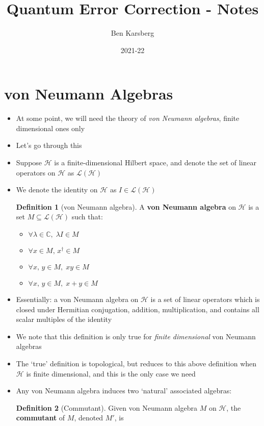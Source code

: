 \documentclass[12pt,a4paper]{article}
\title{Quantum Error Correction - Notes}
\author{Ben Karsberg}
\date{2021-22}
\numberwithin{equation}{section}
\theoremstyle{definition}
\newtheorem{definition}{Definition}[section]
\theoremstyle{theorem}
\begin{document}
	\maketitle
	\section{von Neumann Algebras}
	\newcommand{\lops}{\mathcal{L}(\mathcal{H})}
	\begin{itemize}
		\item At some point, we will need the theory of \textit{von Neumann algebras}, finite dimensional ones only
		\item Let's go through this
		\item Suppose $\mathcal{H}$ is a finite-dimensional Hilbert space, and denote the set of linear operators on $\mathcal{H}$ as $\lops$
		\item We denote the identity on $\mathcal{H}$ as $I\in\lops$
		\begin{definition}[von Neumann algebra]
			A \textbf{von Neumann algebra} on $\mathcal{H}$ is a set $M\subseteq\lops$ such that:
			\begin{itemize}
				\item $\forall \lambda\in\mathbb{C},\;\lambda I\in M$
				\item $\forall x\in M,\,x^{\dagger}\in M$
				\item $\forall x,\,y\in M,\; xy\in M$
				\item $\forall x,\,y\in M,\; x+y\in M$
			\end{itemize}
		\end{definition}
		\item Essentially: a von Neumann algebra on $\mathcal{H}$ is a set of linear operators which is closed under Hermitian conjugation, addition, multiplication, and contains all scalar multiples of the identity
		\item We note that this definition is only true for \textit{finite dimensional} von Neumann algebras
		\item The `true' definition is topological, but reduces to this above definition when $\mathcal{H}$ is finite dimensional, and this is the only case we need 
		\item Any von Neumann algebra induces two `natural' associated algebras:
		\begin{definition}[Commutant]
			Given von Neumann algebra $M$ on $\mathcal{H}$, the \textbf{commutant} of $M$, denoted $M'$, is
			\begin{equation}

\end{equation}
\end{definition}
\end{itemize}
\end{document}
